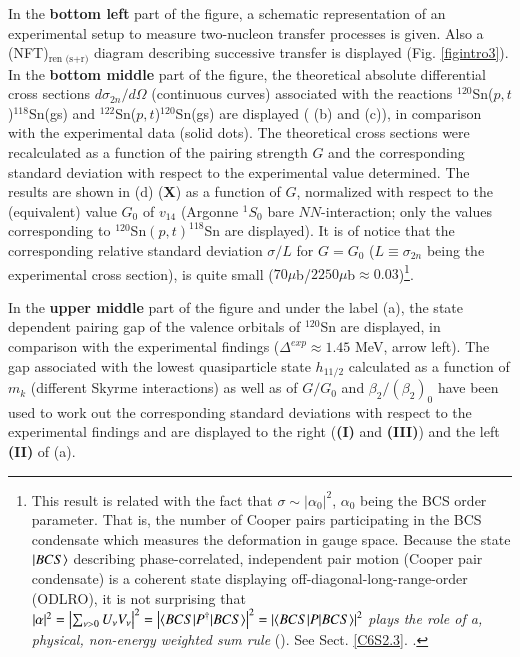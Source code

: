   In the \textbf{bottom left} part of the figure, a schematic representation of an experimental setup to measure   two-nucleon transfer processes is given. Also a (NFT)$_{\text{ren (s+r)}}$ diagram describing  successive transfer is displayed (Fig. \ref{figintro3}). In the \textbf{bottom middle} part of the figure, the theoretical absolute differential cross sections $d\sigma_{2n}/d\Omega$ (continuous curves) associated with the reactions $^{120}$Sn($p,t$)$^{118}$Sn(gs) and $^{122}$Sn($p,t$)$^{120}$Sn(gs) are displayed ( (b) and (c)), in comparison with the experimental data (solid dots). The theoretical cross sections were recalculated as a function of the pairing strength $G$ and the corresponding standard deviation with respect to the experimental value determined. The results are shown in (d) (\textbf{X}) as a function of $G$, normalized with respect to the (equivalent) value $G_0$ of $v_{14}$ (Argonne $^1S_0$ bare $NN$-interaction; only the values corresponding to $^{120}$Sn$(p,t)^{118}$Sn are displayed). It is of notice that the corresponding relative standard deviation $\sigma/L$ for $G=G_0$  ($L\equiv\sigma_{2n}$ being the experimental cross section),  is quite small ($70\mu$b/$2250\mu$b$\approx0.03$)\footnote{This result is related with the fact that $\sigma\sim|\alpha_0|^2$, $\alpha_0$ being the BCS order parameter. That is, the number of Cooper pairs 
  	 participating in the BCS condensate which measures the deformation in gauge space. Because the state $|{BCS} \rangle$ describing phase-correlated, independent pair motion (Cooper pair condensate) is a coherent state displaying off-diagonal-long-range-order 
  	 (ODLRO), it is not surprising that $|\alpha|^2=\left|\sum_{\nu>0}U_\nu V_\nu\right|^2=\left|\langle {BCS|P^\dagger|BCS} \rangle\right|^2=\left|\langle {BCS|P|BCS} \rangle\right|^2$ \textit{plays the role of a, physical, non-energy weighted sum rule}  (\cite{Potel:17}). See Sect. \ref{C6S2.3}.  .}.
  
  
  
  In the  \textbf{upper middle} part of the figure and under the label  (a), the state dependent pairing gap of the  valence orbitals of $^{120}$Sn are displayed, in comparison with the experimental findings ($\Delta^{exp}\approx1.45$ MeV, arrow left). The gap associated with the lowest quasiparticle state $h_{11/2}$ calculated as a function of $m_k$ (different Skyrme interactions) as well as of $G/G_0$ and $\beta_2/(\beta_2)_0$ have been used to work out the corresponding   standard deviations with respect to the experimental findings and are displayed to the right (\textbf{(I)} and \textbf{(III)}) and the left \textbf{(II)}  of (a).
  
